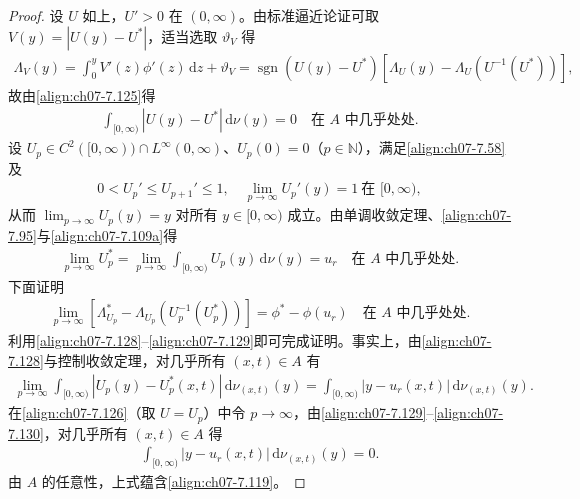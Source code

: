 \documentclass[../../main.tex]{subfiles}%
\begin{document}
\begin{proof}
设 $U$ 如上，$U'>0$ 在 $(0,\infty)$。由标准逼近论证可取 $V(y)=|U(y)-U^*|$，适当选取 $\vartheta_V$ 得
\begin{align*}
\Lambda_V(y)=\int_0^y V'(z)\phi'(z)\,\mathrm{d}z+\vartheta_V
=\operatorname{sgn}(U(y)-U^*)[\Lambda_U(y)-\Lambda_U(U^{-1}(U^*))],
\end{align*}
故由\eqref{align:ch07-7.125}得
\begin{align}
[\Lambda_U^*-\Lambda_U(U^{-1}(U^*))]\int_{[0,\infty)}|U(y)-U^*|\,\mathrm{d}\nu(y)=0
\quad\text{在 }A\text{ 中几乎处处}. \label{align:ch07-7.126}
\end{align}
设 $U_p\in C^2([0,\infty))\cap L^\infty(0,\infty)$、$U_p(0)=0$（$p\in\mathbb{N}$），满足\eqref{align:ch07-7.58}及
\begin{align}
0<U_p'\leqslant U_{p+1}'\leqslant1,\quad \lim_{p\to\infty}U_p'(y)=1\ \text{在 }[0,\infty), \label{align:ch07-7.127}
\end{align}
从而 $\lim_{p\to\infty}U_p(y)=y$ 对所有 $y\in[0,\infty)$ 成立。由单调收敛定理、\eqref{align:ch07-7.95}与\eqref{align:ch07-7.109a}得
\begin{align}
\lim_{p\to\infty}U_p^*=\lim_{p\to\infty}\int_{[0,\infty)}U_p(y)\,\mathrm{d}\nu(y)=u_r\quad\text{在 }A\text{ 中几乎处处}. \label{align:ch07-7.128}
\end{align}
下面证明
\begin{align}
\lim_{p\to\infty}[\Lambda_{U_p}^*-\Lambda_{U_p}(U_p^{-1}(U_p^*))]=\phi^*-\phi(u_r)\quad\text{在 }A\text{ 中几乎处处}. \label{align:ch07-7.129}
\end{align}
利用\eqref{align:ch07-7.128}--\eqref{align:ch07-7.129}即可完成证明。事实上，由\eqref{align:ch07-7.128}与控制收敛定理，对几乎所有 $(x,t)\in A$ 有
\begin{align}
\lim_{p\to\infty}\int_{[0,\infty)}|U_p(y)-U_p^*(x,t)|\,\mathrm{d}\nu_{(x,t)}(y)
=\int_{[0,\infty)}|y-u_r(x,t)|\,\mathrm{d}\nu_{(x,t)}(y). \label{align:ch07-7.130}
\end{align}
在\eqref{align:ch07-7.126}（取 $U=U_p$）中令 $p\to\infty$，由\eqref{align:ch07-7.129}--\eqref{align:ch07-7.130}，对几乎所有 $(x,t)\in A$ 得
\begin{align*}
[\phi^*(x,t)-\phi(u_r(x,t))]\int_{[0,\infty)}|y-u_r(x,t)|\,\mathrm{d}\nu_{(x,t)}(y)=0.
\end{align*}
由 $A$ 的任意性，上式蕴含\eqref{align:ch07-7.119}。


\end{proof}
\end{document}
